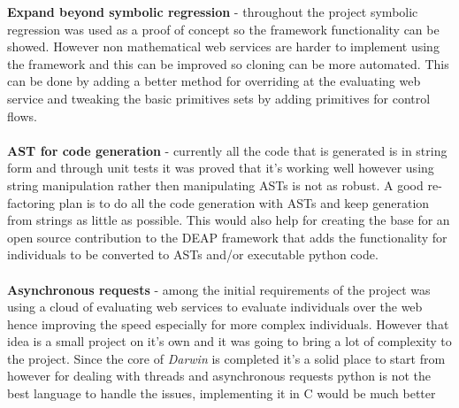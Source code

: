 \textbf{Expand beyond symbolic regression} - throughout the project symbolic regression was 
used as a proof of concept so the framework functionality can be showed. However non mathematical
web services are harder to implement using the framework and this can be improved so cloning can be
more automated. This can be done by adding a better method for overriding at the evaluating web service
and tweaking the basic primitives sets by adding primitives for control flows.
\paragraph{}
\textbf{AST for code generation} - currently all the code that is generated is in string form and through
unit tests it was proved that it's working well however using string manipulation rather then manipulating ASTs
is not as robust. A good re-factoring plan is to do all the code generation with ASTs and keep generation from
strings as little as possible. This would also help for creating the base for an open source contribution to
the DEAP framework that adds the functionality for individuals to be converted to ASTs and/or executable python code.
\paragraph{}
\textbf{Asynchronous requests} - among the initial requirements of the project was using a cloud of evaluating
web services to evaluate individuals over the web hence improving the speed especially for more complex
individuals. However that idea is a small project on it's own and it was going to bring a lot of complexity to the project.
Since the core of \textit{Darwin} is completed it's a solid place to start from however for dealing with threads
and asynchronous requests python is not the best language to handle the issues, implementing it in C would be much better